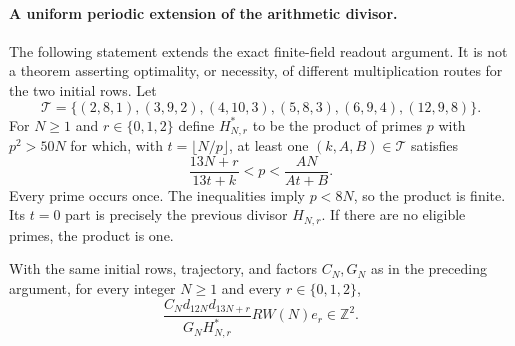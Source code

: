 \paragraph{A uniform periodic extension of the arithmetic divisor.}
The following statement extends the exact finite-field readout argument.
It is not a theorem asserting optimality, or necessity, of different
multiplication routes for the two initial rows.
Let
\[
 \mathcal T=\{(2,8,1),(3,9,2),(4,10,3),
                (5,8,3),(6,9,4),(12,9,8)\}.
\]
For $N\ge1$ and $r\in\{0,1,2\}$ define $H^*_{N,r}$ to be the product
of primes $p$ with $p^2>50N$ for which, with $t=\lfloor N/p\rfloor$,
at least one $(k,A,B)\in\mathcal T$ satisfies
\[
 \frac{13N+r}{13t+k}<p<\frac{AN}{At+B}.
 \tag{L1}
\]
Every prime occurs once. The inequalities imply $p<8N$, so the product
is finite. Its $t=0$ part is precisely the previous divisor $H_{N,r}$.
If there are no eligible primes, the product is one.

\begin{theorem}
With the same initial rows, trajectory, and factors $C_N,G_N$ as in
the preceding argument, for every integer $N\ge1$ and every
$r\in\{0,1,2\}$,
\[
 \boxed{\frac{C_Nd_{12N}d_{13N+r}}{G_NH^*_{N,r}}
             RW(N)e_r\in\mathbb Z^2.}
\]
\end{theorem}

